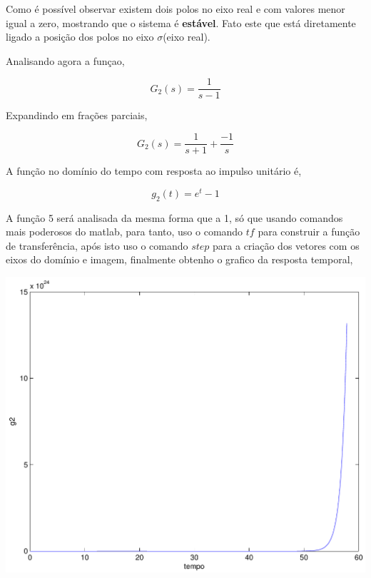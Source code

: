 \documentclass[paper=a4, fontsize=11pt]{article}
\begin{document}
Como é possível observar existem dois polos no eixo real e com valores 
menor igual a zero, mostrando que o sistema é \textbf{estável}. Fato este
que está diretamente ligado a posição dos polos no eixo $\sigma$(eixo real).

Analisando agora a funçao,

\begin{equation}
    G_2(s) = \frac{1}{s-1}
\end{equation}

Expandindo em frações parciais,

\begin{equation}
    G_2(s) = \frac{1}{s+1} + \frac{-1}{s}
\end{equation}

A função no domínio do tempo com resposta ao impulso unitário é,

\begin{equation}
    g_2(t) =  e^{t} - 1
\end{equation}

A função 5 será analisada da mesma forma que a 1, só que usando comandos
mais poderosos do matlab, para tanto, uso o comando $tf$ para construir 
a função de transferência, após isto uso o comando $step$ para a criação
dos vetores com os eixos do domínio e imagem, finalmente obtenho o grafico
da resposta temporal,

\begin{center}
    \includegraphics[scale=.5]{q1g2.pdf}
\end{center}
\end{document}
